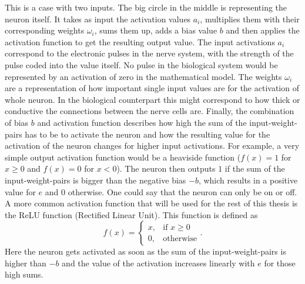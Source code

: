 This is a case with two inputs. The big circle in the middle is representing the neuron itself. It takes as input the activation values $a_i$, multiplies them with their corresponding weights $\omega_i$, sums them up, adds a bias value $b$ and then applies the activation function to get the resulting output value. The input activations $a_i$ correspond to the electronic pulses in the nerve system, with the strength of the pulse coded into the value itself. No pulse in the biological system would be represented by an activation of zero in the mathematical model. The weights $\omega_i$ are a representation of how important single input values are for the activation of whole neuron. In the biological counterpart this might correspond to how thick or conductive the connections between the nerve cells are. Finally, the combination of bias $b$ and activation function describes how high the sum of the input-weight-pairs has to be to activate the neuron and how the resulting value for the activation of the neuron changes for higher input activations. For example, a very simple output activation function would be a heaviside function ($f(x) = 1$ for $x\geq0$ and $f(x) = 0$ for $x<0$). The neuron then outputs $1$ if the sum of the input-weight-pairs is bigger than the negative bias $-b$, which results in a positive value for $e$ and $0$ otherwise. One could say that the neuron can only be on or off. A more common activation function that will be used for the rest of this thesis is the ReLU function (Rectified Linear Unit). This function is defined as 
\begin{equation}
	f(x) = 
	\begin{cases}
		x, &\text{if } x\geq0 \\
		0, &\text{otherwise}
	\end{cases}.
\end{equation}
Here the neuron gets activated as soon as the sum of the input-weight-pairs is higher than $-b$ and the value of the activation increases linearly with $e$ for those high sums.
